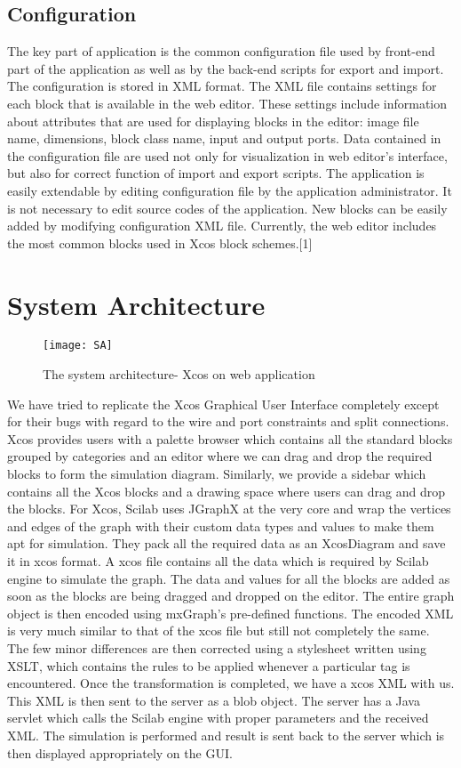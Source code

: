 \documentclass[conference]{IEEEtran}
\begin{document}
\subsection{Configuration}
The key part of application is the common configuration file
used by front-end part of the application as well as by the
back-end scripts for export and import. The configuration is
stored in XML format. The XML file contains settings for
each block that is available in the web editor. These settings
include information about attributes that are used for
displaying blocks in the editor: image file name, dimensions,
block class name, input and output ports.
Data contained in the configuration file are used not only for
visualization in web editor’s interface, but also for correct
function of import and export scripts.
The application is easily extendable by editing configuration
file by the application administrator. It is not necessary to edit
source codes of the application. New blocks can be easily
added by modifying configuration XML file. Currently, the
web editor includes the most common blocks used in Xcos
block schemes.[1]

\section{System Architecture}
\begin{figure}
    \centering
    \texttt{[image: SA]}
    \caption{The system architecture- Xcos on web application}
    \label{fig:my_label}
\end{figure}
We have tried to replicate the Xcos Graphical User Interface completely except for their bugs with regard to the wire and port constraints and split connections. Xcos provides users with a palette browser which contains all the standard blocks grouped by categories and an editor where we can drag and drop the required blocks to form the simulation diagram.
Similarly, we provide a sidebar which contains all the Xcos blocks and a
drawing space where users can drag and drop the blocks. For Xcos, Scilab uses JGraphX at the very core and wrap the vertices and edges of the graph with their custom data types and values to make them apt for simulation. They pack all the required data as an XcosDiagram and save it in xcos format.
A xcos file contains all the data which is required
by Scilab engine to simulate the graph.
The data and values for all the blocks are added as soon as the blocks
are being dragged and dropped on the editor. The entire graph object
is then encoded using mxGraph's pre-defined functions. The encoded
XML is very much similar to that of the xcos file but still not
completely the same. The few minor differences are then corrected
using a stylesheet written using XSLT, which contains the rules to be applied whenever a particular tag is encountered. Once the transformation is completed, we have a xcos XML with us. This XML is then sent to the server as a blob object.
The server has a Java servlet which calls the Scilab engine with
proper parameters and the received XML. The simulation is
performed and result is sent back to the server which is then displayed
appropriately on the GUI.
\end{document}
